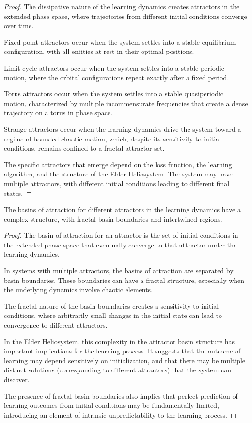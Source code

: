 \begin{proof}
The dissipative nature of the learning dynamics creates attractors in the extended phase space, where trajectories from different initial conditions converge over time.

Fixed point attractors occur when the system settles into a stable equilibrium configuration, with all entities at rest in their optimal positions.

Limit cycle attractors occur when the system settles into a stable periodic motion, where the orbital configurations repeat exactly after a fixed period.

Torus attractors occur when the system settles into a stable quasiperiodic motion, characterized by multiple incommensurate frequencies that create a dense trajectory on a torus in phase space.

Strange attractors occur when the learning dynamics drive the system toward a regime of bounded chaotic motion, which, despite its sensitivity to initial conditions, remains confined to a fractal attractor set.

The specific attractors that emerge depend on the loss function, the learning algorithm, and the structure of the Elder Heliosystem. The system may have multiple attractors, with different initial conditions leading to different final states.
\end{proof}

\begin{theorem}
The basins of attraction for different attractors in the learning dynamics have a complex structure, with fractal basin boundaries and intertwined regions.
\end{theorem}

\begin{proof}
The basin of attraction for an attractor is the set of initial conditions in the extended phase space that eventually converge to that attractor under the learning dynamics.

In systems with multiple attractors, the basins of attraction are separated by basin boundaries. These boundaries can have a fractal structure, especially when the underlying dynamics involve chaotic elements.

The fractal nature of the basin boundaries creates a sensitivity to initial conditions, where arbitrarily small changes in the initial state can lead to convergence to different attractors.

In the Elder Heliosystem, this complexity in the attractor basin structure has important implications for the learning process. It suggests that the outcome of learning may depend sensitively on initialization, and that there may be multiple distinct solutions (corresponding to different attractors) that the system can discover.

The presence of fractal basin boundaries also implies that perfect prediction of learning outcomes from initial conditions may be fundamentally limited, introducing an element of intrinsic unpredictability to the learning process.
\end{proof}

